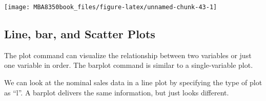 \documentclass[
]{book}
\newenvironment{Shaded}{\begin{snugshade}}{\end{snugshade}}
\newcommand{\AttributeTok}[1]{\textcolor[rgb]{0.77,0.63,0.00}{#1}}
\newcommand{\DecValTok}[1]{\textcolor[rgb]{0.00,0.00,0.81}{#1}}
\newcommand{\FunctionTok}[1]{\textcolor[rgb]{0.00,0.00,0.00}{#1}}
\newcommand{\NormalTok}[1]{#1}
\newcommand{\SpecialCharTok}[1]{\textcolor[rgb]{0.00,0.00,0.00}{#1}}
\newcommand{\StringTok}[1]{\textcolor[rgb]{0.31,0.60,0.02}{#1}}
\begin{document}
\begin{Shaded}
\end{Shaded}

\begin{center}\texttt{[image: MBA8350book\_files/figure-latex/unnamed-chunk-43-1]} \end{center}

\hypertarget{line-bar-and-scatter-plots}{%
\subsection{Line, bar, and Scatter Plots}\label{line-bar-and-scatter-plots}}

The plot command can visualize the relationship between two variables or just one variable in order. The barplot command is similar to a single-variable plot.

We can look at the nominal sales data in a line plot by specifying the type of plot as ``l''. A barplot delivers the same information, but just looks different.

\begin{Shaded}
\end{Shaded}
\end{document}
